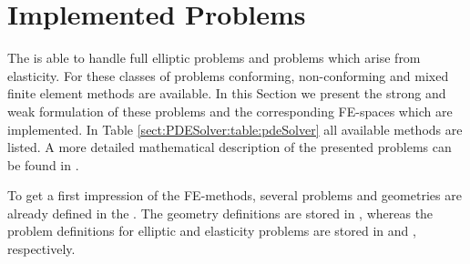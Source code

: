 \section{Implemented Problems}
\label{sect:ImplementedProblems}
%

\noindent The \FFW is able to handle full elliptic problems and problems which arise from elasticity. For these classes of problems conforming, non-conforming and mixed finite element methods are available. In this Section we present the strong and weak formulation of these problems and the corresponding FE-spaces which are implemented. In Table \ref{sect:PDESolver:table:pdeSolver} all available methods are listed. A more detailed mathematical description of the presented problems can be found in \cite{Ar,ArWi,Bra,HaFaIo}.

\medskip

\noindent To get a first impression of the FE-methods, several problems and geometries are already defined in the \FFW\!. The geometry definitions are stored in , whereas the problem definitions for elliptic and elasticity problems are stored in  and , respectively.

\medskip





%
